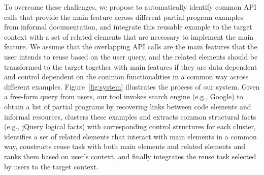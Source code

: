 To overcome these challenges, we propose to automatically identify common API calls that provide the main feature across different partial program examples from informal documentation, and integrate this reusable example to the target context with a set of related elements that are necessary to implement the main feature. We assume that the overlapping API calls are the main features that the user intends to reuse based on the user query, and the related elements should be transformed to the target together with main features if they are data dependent and control dependent on the common functionalities in a common way across different examples. 
Figure~\ref{fig:system} illustrates the process of our system. 
Given a free-form query from users, our tool invokes search engine (e.g., Google) to obtain a list of partial programs by recovering links between code elements and informal resources, clusters these examples and extracts common structural facts (e.g., jQuery logical facts) with corresponding control structures for each cluster, identifies a set of related elements that interact with main elements in a common way,  constructs reuse task with both main elements and related elements and ranks them based on user's context, and finally integrates the reuse task selected by users to the target context. 


